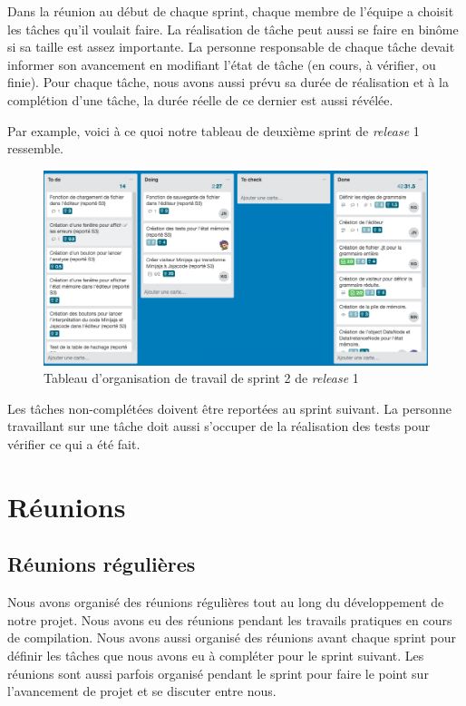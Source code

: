 \documentclass[a4paper,12pt]{article}
\begin{document}
Dans la réunion au début de chaque sprint, chaque membre de l'équipe a choisit les tâches qu'il voulait faire. La réalisation de tâche peut aussi se faire en binôme si sa taille est assez importante. La personne responsable de chaque tâche devait informer son avancement en modifiant l'état de tâche (en cours, à vérifier, ou finie). Pour chaque tâche, nous avons aussi prévu sa durée de réalisation et à la complétion d'une tâche, la durée réelle de ce dernier est aussi révélée.

Par example, voici à ce quoi notre tableau de deuxième sprint de \textit{release} 1 ressemble.

\begin{figure}[H]
\begin{center}
	\includegraphics[scale=0.3]{sprint2}
	\caption{Tableau d'organisation de travail de sprint 2 de \textit{release} 1}
\end{center}
\end{figure}

Les tâches non-complétées doivent être reportées au sprint suivant. La personne travaillant sur une tâche doit aussi s'occuper de la réalisation des tests pour vérifier ce qui a été fait.


\section{Réunions}
\subsection{Réunions régulières}
Nous avons organisé des réunions régulières tout au long du développement de notre projet. Nous avons eu des réunions pendant les travails pratiques en cours de compilation. Nous avons aussi organisé des réunions avant chaque sprint pour définir les tâches que nous avons eu à compléter pour le sprint suivant. Les réunions sont aussi parfois organisé pendant le sprint pour faire le point sur l'avancement de projet et se discuter entre nous. 
\end{document}
